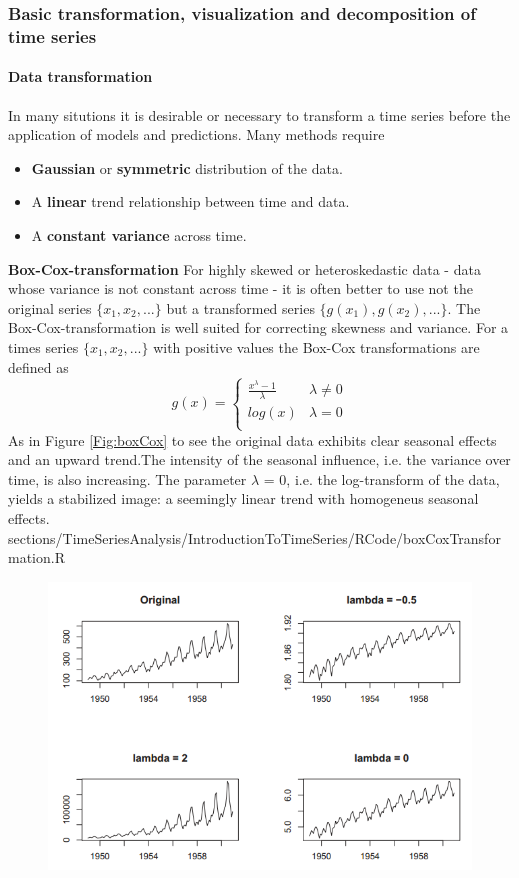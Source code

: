 {\subsubsection{Basic transformation, visualization and decomposition of time series}
{\paragraph{Data transformation}
	In many situtions it is desirable or necessary to transform a time series before the application of models and predictions. Many methods require
	\begin{itemize}
		\item \textbf{Gaussian} or \textbf{symmetric} distribution of the data.
		\item A \textbf{linear} trend relationship between time and data.
		\item A \textbf{constant variance} across time.
	\end{itemize}
\RTheory
{\textbf{Box-Cox-transformation}\vfill
For highly skewed or heteroskedastic data - data whose variance is not constant across time - it is often better to use not the original series $\{x_1, x_2, ...\}$ but a transformed series $\{g(x_1), g(x_2),...\}$. The Box-Cox-transformation is well suited for correcting skewness and variance.
\vfill
\hfill
\break
For a times series $\{x_1, x_2, . . . \}$ with positive values the Box-Cox transformations
are defined as
$$ g(x)=\begin{cases}
\frac{x^{\lambda}-1}{\lambda} &\lambda \neq 0\\
log(x) &\lambda = 0\\
\end{cases}$$
As in Figure \ref{Fig:boxCox} to see the original data exhibits clear seasonal effects and an upward trend.The intensity of
the seasonal influence, i.e. the variance over time, is also increasing. The parameter $\lambda$ = 0, i.e. the log-transform of the data, yields a stabilized image: a
seemingly linear trend with homogeneus seasonal effects.
}
{sections/TimeSeriesAnalysis/IntroductionToTimeSeries/RCode/boxCoxTransformation.R}
\begin{figure}[H]\centering
	\includegraphics[width=0.7\linewidth]{images/boxCox.png}

\end{figure}}}
